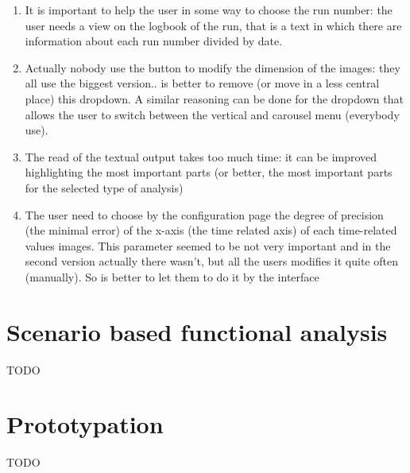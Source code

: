 \begin{enumerate}
\item 
It is important to help the user in some way to choose the run number: the user needs a view on the logbook of the run, that is a text in which there are information about each run number divided by date.

\item
Actually nobody use the button to modify the dimension of the images: they all use the biggest version.. is better to remove (or move in a less central place) this dropdown. A similar reasoning can be done for the dropdown that allows the user to switch between the vertical and carousel menu (everybody use).

\item
The read of the textual output takes too much time: it can be improved highlighting the most important parts (or better, the most important parts for the selected type of analysis)

\item
The user need to choose by the configuration page the degree of precision (the minimal error) of the x-axis (the time related axis) of each time-related values images. This parameter seemed to be not very important and in the second version actually there wasn't, but all the users modifies it quite often (manually). So is better to let them to do it by the interface

\end{enumerate}

\section{Scenario based functional analysis}
TODO

\section{Prototypation}
TODO 